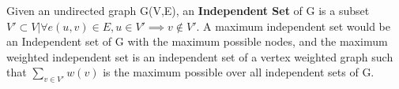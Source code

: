 Given an undirected graph G(V,E), an {\bfseries Independent Set} of G is a subset $V' \subset V | \forall e(u,v) \in E, u \in V' \implies v \notin V'$. A maximum independent set would be an Independent set of G with the maximum possible nodes, and the maximum weighted independent set is an independent set of a vertex weighted graph such that $\sum_{v \in V'} w(v)$ is the maximum possible over all independent sets of G.

